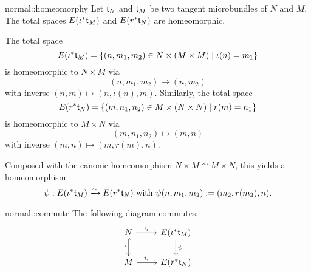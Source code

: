 \begin{mylemma}{normal::homeomorphy}{}
    Let $\mathfrak{t}_N$ and $\mathfrak{t}_M$ be two tangent microbundles of $N$ and $M$.
    The total spaces $E(\iota^*\mathfrak{t}_M)$ and $E(r^*\mathfrak{t}_N)$ are homeomorphic.
\end{mylemma}

\begin{myproof}
    The total space
    \[ E(\iota^*\mathfrak{t}_M) = \{ (n, m_1, m_2) \in N \times (M \times M) \mid \iota(n) = m_1\} \]
    is homeomorphic to $N \times M$ via
    \[ (n, m_1, m_2) \mapsto (n, m_2) \]
    with inverse $(n, m) \mapsto (n, \iota(n), m)$.
    Similarly, the total space
    \[ E(r^*\mathfrak{t}_N) = \{ (m, n_1, n_2) \in M \times (N \times N) \mid r(m) = n_1\} \]
    is homeomorphic to $M \times N$ via
    \[ (m, n_1, n_2) \mapsto (m, n) \]
    with inverse $(m, n) \mapsto (m, r(m), n)$.
    
    Composed with the canonic homeomorphism $N \times M \cong M \times N$, this yields a homeomorphism
    \[ \psi: E(\iota^*\mathfrak{t}_M) \xrightarrow{\sim} E(r^*\mathfrak{t}_N) \text{ with } \psi(n, m_1, m_2) := (m_2, r(m_2), n). \]
\end{myproof}

\begin{myremark}{normal::commute}{}
    The following diagram commutes:
    \[
        \begin{tikzcd}
            N \ar[r, "i_\iota"] \ar[hookrightarrow, "\iota"']{d} & E(\ind{\iota}\bt_M) \ar[d, "\psi"] \\
            M \ar[r, "i_r"] & E(\ind{r}\bt_N)
        \end{tikzcd}
    \]
\end{myremark}